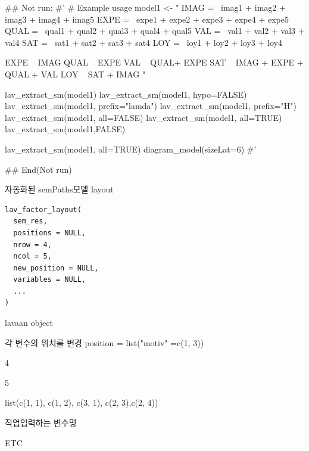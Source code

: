 \documentclass[a4paper]{book}
\begin{document}
%
\begin{Examples}
\begin{ExampleCode}

## Not run: 
#'
# Example usage
model1 <- "
IMAG =~ imag1 + imag2 + imag3 + imag4 + imag5
EXPE =~ expe1 + expe2 + expe3 + expe4 + expe5
QUAL =~ qual1 + qual2 + qual3 + qual4 + qual5
VAL =~ val1 + val2 + val3 + val4
SAT =~ sat1 + sat2 + sat3 + sat4
LOY =~ loy1 + loy2 + loy3 + loy4

EXPE ~ IMAG
QUAL ~ EXPE
VAL ~  QUAL+ EXPE
SAT ~ IMAG + EXPE + QUAL + VAL
LOY ~ SAT + IMAG
"


lav_extract_sm(model1)%
lav_extract_sm(model1, hypo=FALSE)%
lav_extract_sm(model1, prefix="lamda")%
lav_extract_sm(model1, prefix="H")%
lav_extract_sm(model1, all=FALSE) %
lav_extract_sm(model1, all=TRUE) %
lav_extract_sm(model1,FALSE) %


lav_extract_sm(model1, all=TRUE) %
  diagram_model(sizeLat=6)
#'


## End(Not run)


\end{ExampleCode}
\end{Examples}
%
\begin{Description}
자동화된 semPaths모델 layout
\end{Description}
%
\begin{Usage}
\begin{verbatim}
lav_factor_layout(
  sem_res,
  positions = NULL,
  nrow = 4,
  ncol = 5,
  new_position = NULL,
  variables = NULL,
  ...
)
\end{verbatim}
\end{Usage}
%
\begin{Arguments}
\begin{ldescription}
\item[\code{sem\_res}] lavaan object

\item[\code{positions}] 각 변수의 위치를 변경 position = list("motiv" =c(1, 3))

\item[\code{nrow}] 4

\item[\code{ncol}] 5

\item[\code{new\_position}] list(c(1, 1), c(1, 2), c(3, 1), c(2, 3),c(2, 4))

\item[\code{variables}] 직업입력하는 변수명

\item[\code{...}] ETC
\end{ldescription}
\end{Arguments}
\end{document}
